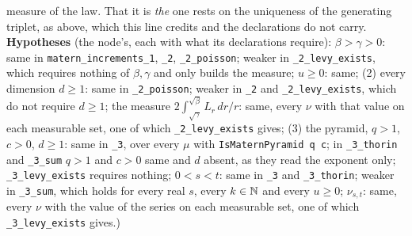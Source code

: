 \begin{proposition}
{measure of the law. That it is \emph{the} one rests on the uniqueness of the generating triplet,
 as above, which this line credits and the declarations do not carry.
\textbf{Hypotheses} (the node's, each with what its declarations require): $\beta > \gamma > 0$: same
in \texttt{matern\_increments\_1}, \texttt{\_2}, \texttt{\_2\_poisson}; weaker in
\texttt{\_2\_levy\_exists}, which requires nothing of $\beta, \gamma$ and only builds the measure;
$u \ge 0$: same; (2) every dimension $d \ge 1$: same in \texttt{\_2\_poisson}; weaker in
\texttt{\_2} and \texttt{\_2\_levy\_exists}, which do not require $d \ge 1$; the \Levy{} measure
$2\int_{\sqrt\gamma}^{\sqrt\beta}L_r\,dr/r$: same, every $\nu$ with that value on each measurable set,
one of which \texttt{\_2\_levy\_exists} gives; (3) the \Matern{} pyramid, $q > 1$, $c > 0$,
$d \ge 1$: same in \texttt{\_3}, over every $\mu$ with \texttt{IsMaternPyramid q c}; in
\texttt{\_3\_thorin} and \texttt{\_3\_sum} $q > 1$ and $c > 0$ same and $d$ absent, as they read the
exponent only; \texttt{\_3\_levy\_exists} requires nothing; $0 < s < t$: same in \texttt{\_3} and
\texttt{\_3\_thorin}; weaker in \texttt{\_3\_sum}, which holds for every real $s$, every $k \in \mathbb{N}$
and every $u \ge 0$; $\nu_{s,t}$: same, every $\nu$ with the value of the series on each measurable
set, one of which \texttt{\_3\_levy\_exists} gives.)}
\end{proposition}

